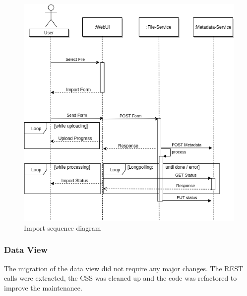 \begin{figure}[H]
	\centering\includegraphics[width=.75\textwidth]{res/Import}
	\caption{Import sequence diagram}
	\label{fig:import}
\end{figure}


\subsubsection{Data View}
The migration of the data view did not require any major changes. The REST calls were extracted, the CSS was cleaned up and the code was refactored to improve the maintenance.

